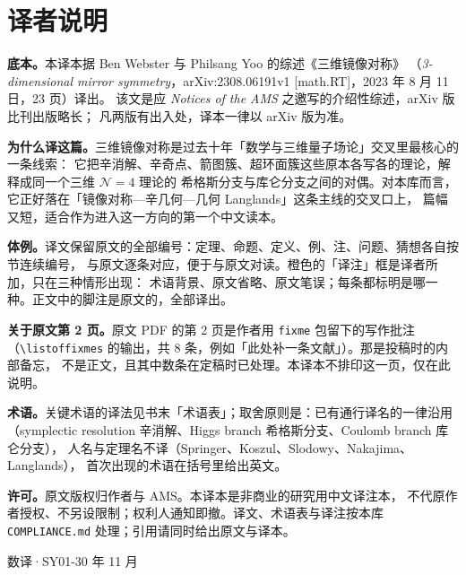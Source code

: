 \section*{译者说明}

\textbf{底本。}本译本据 Ben Webster 与 Philsang Yoo 的综述《三维镜像对称》
（\textit{3-dimensional mirror symmetry}，arXiv:2308.06191v1 [math.RT]，2023 年 8 月 11 日，23 页）译出。
该文是应 \textit{Notices of the AMS} 之邀写的介绍性综述，arXiv 版比刊出版略长；
凡两版有出入处，译本一律以 arXiv 版为准。

\textbf{为什么译这篇。}三维镜像对称是过去十年「数学与三维量子场论」交叉里最核心的一条线索：
它把辛消解、辛奇点、箭图簇、超环面簇这些原本各写各的理论，解释成同一个三维 $\mathcal N=4$ 理论的
希格斯分支与库仑分支之间的对偶。对本库而言，它正好落在「镜像对称—辛几何—几何 Langlands」这条主线的交叉口上，
篇幅又短，适合作为进入这一方向的第一个中文读本。

\textbf{体例。}译文保留原文的全部编号：定理、命题、定义、例、注、问题、猜想各自按节连续编号，
与原文逐条对应，便于与原文对读。橙色的「译注」框是译者所加，只在三种情形出现：
术语背景、原文省略、原文笔误；每条都标明是哪一种。正文中的脚注是原文的，全部译出。

\textbf{关于原文第 2 页。}原文 PDF 的第 2 页是作者用 \texttt{fixme} 包留下的写作批注
（\texttt{\textbackslash listoffixmes} 的输出，共 8 条，例如「此处补一条文献」）。那是投稿时的内部备忘，
不是正文，且其中数条在定稿时已处理。本译本不排印这一页，仅在此说明。

\textbf{术语。}关键术语的译法见书末「术语表」；取舍原则是：已有通行译名的一律沿用
（symplectic resolution 辛消解、Higgs branch 希格斯分支、Coulomb branch 库仑分支），
人名与定理名不译（Springer、Koszul、Slodowy、Nakajima、Langlands），
首次出现的术语在括号里给出英文。

\textbf{许可。}原文版权归作者与 AMS。本译本是非商业的研究用中文译注本，
不代原作者授权、不另设限制；权利人通知即撤。译文、术语表与译注按本库
\texttt{COMPLIANCE.md} 处理；引用请同时给出原文与译本。

\vspace{0.5em}
\begin{flushright}
数译·SY01-30 年 11 月
\end{flushright}

\clearpage
